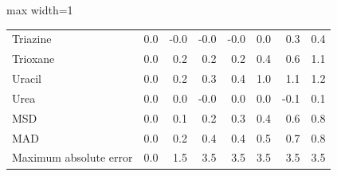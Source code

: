 \begin{table}[h]
\begin{adjustbox}{max width=1\textwidth}
\begin{tabular}{lrrrrrrr}
Triazine & 0.0 & -0.0 & -0.0 & -0.0 & 0.0 & 0.3 & 0.4 \\
Trioxane & 0.0 & 0.2 & 0.2 & 0.2 & 0.4 & 0.6 & 1.1 \\
Uracil & 0.0 & 0.2 & 0.3 & 0.4 & 1.0 & 1.1 & 1.2 \\
Urea & 0.0 & 0.0 & -0.0 & 0.0 & 0.0 & -0.1 & 0.1 \\
MSD & 0.0 & 0.1 & 0.2 & 0.3 & 0.4 & 0.6 & 0.8 \\
MAD & 0.0 & 0.2 & 0.4 & 0.4 & 0.5 & 0.7 & 0.8 \\
Maximum absolute error & 0.0 & 1.5 & 3.5 & 3.5 & 3.5 & 3.5 & 3.5 \\
\bottomrule
\end{tabular}
\end{adjustbox}

\end{table}